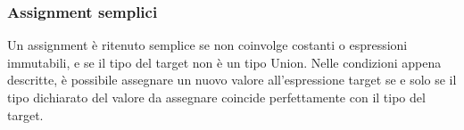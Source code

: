 \subsubsection{Assignment semplici}
Un assignment è ritenuto semplice se non coinvolge costanti o espressioni immutabili, e se
il tipo del target non è un tipo Union. Nelle condizioni appena descritte, è possibile 
assegnare un nuovo valore all'espressione target se e solo se il tipo dichiarato del valore
da assegnare coincide perfettamente con il tipo del target.